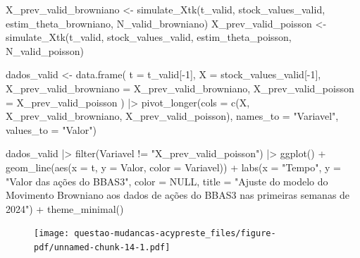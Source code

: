 \documentclass[
  letterpaper,
  DIV=11,
  numbers=noendperiod]{scrreprt}
\newenvironment{Shaded}{\begin{snugshade}}{\end{snugshade}}
\newcommand{\AttributeTok}[1]{\textcolor[rgb]{0.40,0.45,0.13}{#1}}
\newcommand{\ConstantTok}[1]{\textcolor[rgb]{0.56,0.35,0.01}{#1}}
\newcommand{\DecValTok}[1]{\textcolor[rgb]{0.68,0.00,0.00}{#1}}
\newcommand{\FunctionTok}[1]{\textcolor[rgb]{0.28,0.35,0.67}{#1}}
\newcommand{\NormalTok}[1]{\textcolor[rgb]{0.00,0.23,0.31}{#1}}
\newcommand{\OtherTok}[1]{\textcolor[rgb]{0.00,0.23,0.31}{#1}}
\newcommand{\SpecialCharTok}[1]{\textcolor[rgb]{0.37,0.37,0.37}{#1}}
\newcommand{\StringTok}[1]{\textcolor[rgb]{0.13,0.47,0.30}{#1}}
\begin{document}
\begin{Shaded}
\begin{Highlighting}[]
\NormalTok{X\_prev\_valid\_browniano }\OtherTok{\textless{}{-}} \FunctionTok{simulate\_Xtk}\NormalTok{(t\_valid,}
\NormalTok{                                       stock\_values\_valid,}
\NormalTok{                                       estim\_theta\_browniano,}
\NormalTok{                                       N\_valid\_browniano)}
\NormalTok{X\_prev\_valid\_poisson }\OtherTok{\textless{}{-}} \FunctionTok{simulate\_Xtk}\NormalTok{(t\_valid,}
\NormalTok{                                     stock\_values\_valid,}
\NormalTok{                                     estim\_theta\_poisson,}
\NormalTok{                                     N\_valid\_poisson)}

\NormalTok{dados\_valid }\OtherTok{\textless{}{-}} \FunctionTok{data.frame}\NormalTok{(}
    \AttributeTok{t =}\NormalTok{ t\_valid[}\SpecialCharTok{{-}}\DecValTok{1}\NormalTok{],}
    \AttributeTok{X =}\NormalTok{ stock\_values\_valid[}\SpecialCharTok{{-}}\DecValTok{1}\NormalTok{],}
    \AttributeTok{X\_prev\_valid\_browniano =}\NormalTok{ X\_prev\_valid\_browniano,}
    \AttributeTok{X\_prev\_valid\_poisson =}\NormalTok{ X\_prev\_valid\_poisson}
\NormalTok{) }\SpecialCharTok{|\textgreater{}} 
\FunctionTok{pivot\_longer}\NormalTok{(}\AttributeTok{cols =} \FunctionTok{c}\NormalTok{(X, X\_prev\_valid\_browniano, X\_prev\_valid\_poisson),}
             \AttributeTok{names\_to =} \StringTok{"Variavel"}\NormalTok{,}
             \AttributeTok{values\_to =} \StringTok{"Valor"}\NormalTok{) }
\end{Highlighting}
\end{Shaded}

\begin{Shaded}
\begin{Highlighting}[]
\NormalTok{dados\_valid }\SpecialCharTok{|\textgreater{}}
    \FunctionTok{filter}\NormalTok{(Variavel }\SpecialCharTok{!=} \StringTok{"X\_prev\_valid\_poisson"}\NormalTok{) }\SpecialCharTok{|\textgreater{}}
    \FunctionTok{ggplot}\NormalTok{() }\SpecialCharTok{+}
    \FunctionTok{geom\_line}\NormalTok{(}\FunctionTok{aes}\NormalTok{(}\AttributeTok{x =}\NormalTok{ t, }\AttributeTok{y =}\NormalTok{ Valor, }\AttributeTok{color =}\NormalTok{ Variavel)) }\SpecialCharTok{+}
    \FunctionTok{labs}\NormalTok{(}\AttributeTok{x =} \StringTok{"Tempo"}\NormalTok{,}
         \AttributeTok{y =} \StringTok{"Valor das ações do BBAS3"}\NormalTok{,}
         \AttributeTok{color =} \ConstantTok{NULL}\NormalTok{,}
         \AttributeTok{title =} \StringTok{"Ajuste do modelo do Movimento Browniano aos dados}
\StringTok{          de ações do BBAS3 nas primeiras semanas de 2024"}\NormalTok{) }\SpecialCharTok{+}
    \FunctionTok{theme\_minimal}\NormalTok{()}
\end{Highlighting}
\end{Shaded}

\begin{figure}[H]

{\centering \texttt{[image: questao-mudancas-acypreste\_files/figure-pdf/unnamed-chunk-14-1.pdf]}

}

\end{figure}



\printindex
\end{document}
